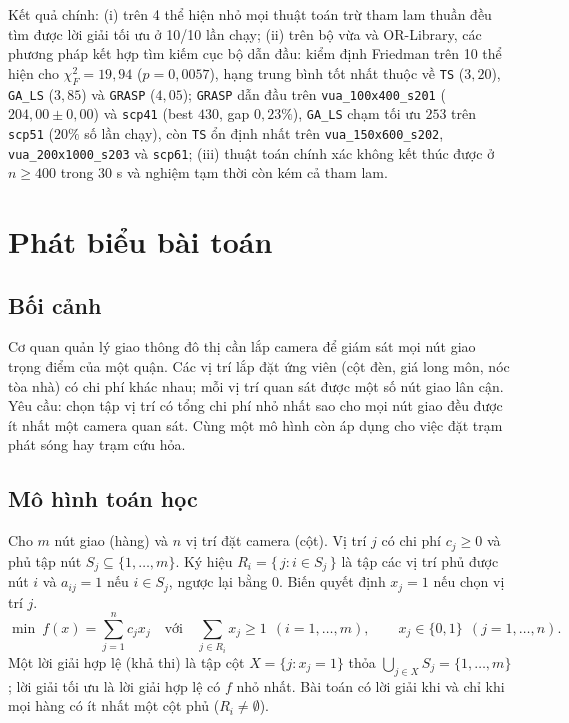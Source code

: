 \documentclass[a4paper,12pt]{article}
\begin{document}
Kết quả chính: (i) trên 4 thể hiện nhỏ mọi thuật toán trừ tham lam thuần đều tìm được lời giải tối ưu ở 10/10 lần chạy; (ii) trên bộ vừa và OR-Library, các phương pháp kết hợp tìm kiếm cục bộ dẫn đầu: kiểm định Friedman trên 10 thể hiện cho $\chi^2_F=19{,}94$ ($p=0{,}0057$), hạng trung bình tốt nhất thuộc về \texttt{TS} ($3{,}20$), \texttt{GA\_LS} ($3{,}85$) và \texttt{GRASP} ($4{,}05$); \texttt{GRASP} dẫn đầu trên \texttt{vua\_100x400\_s201} ($204{,}00 \pm 0{,}00$) và \texttt{scp41} (best $430$, gap $0{,}23\%$), \texttt{GA\_LS} chạm tối ưu $253$ trên \texttt{scp51} ($20\%$ số lần chạy), còn \texttt{TS} ổn định nhất trên \texttt{vua\_150x600\_s202}, \texttt{vua\_200x1000\_s203} và \texttt{scp61}; (iii) thuật toán chính xác không kết thúc được ở $n\ge400$ trong 30 s và nghiệm tạm thời còn kém cả tham lam.

\section{Phát biểu bài toán}
\subsection{Bối cảnh}
Cơ quan quản lý giao thông đô thị cần lắp camera để giám sát mọi nút giao trọng điểm của một quận. Các vị trí lắp đặt ứng viên (cột đèn, giá long môn, nóc tòa nhà) có chi phí khác nhau; mỗi vị trí quan sát được một số nút giao lân cận. Yêu cầu: chọn tập vị trí có tổng chi phí nhỏ nhất sao cho mọi nút giao đều được ít nhất một camera quan sát. Cùng một mô hình còn áp dụng cho việc đặt trạm phát sóng hay trạm cứu hỏa.

\subsection{Mô hình toán học}
Cho $m$ nút giao (hàng) và $n$ vị trí đặt camera (cột). Vị trí $j$ có chi phí $c_j\ge 0$ và phủ tập nút $S_j\subseteq\{1,\dots,m\}$. Ký hiệu $R_i=\{\,j: i\in S_j\,\}$ là tập các vị trí phủ được nút $i$ và $a_{ij}=1$ nếu $i\in S_j$, ngược lại bằng $0$. Biến quyết định $x_j=1$ nếu chọn vị trí $j$.
\[
\min\ f(x)=\sum_{j=1}^{n}c_jx_j
\quad\text{với}\quad
\sum_{j\in R_i}x_j\ge 1\ \ (i=1,\dots,m),\qquad x_j\in\{0,1\}\ \ (j=1,\dots,n).
\]
Một lời giải hợp lệ (khả thi) là tập cột $X=\{j:x_j=1\}$ thỏa $\bigcup_{j\in X}S_j=\{1,\dots,m\}$; lời giải tối ưu là lời giải hợp lệ có $f$ nhỏ nhất. Bài toán có lời giải khi và chỉ khi mọi hàng có ít nhất một cột phủ ($R_i\neq\emptyset$).
\end{document}
